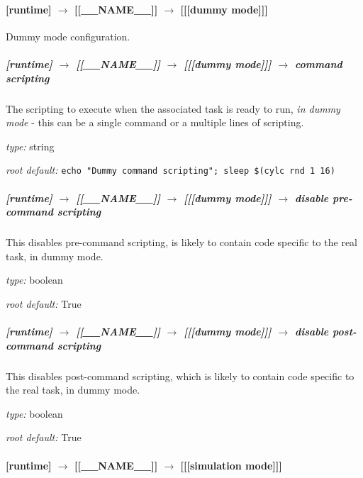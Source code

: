 \paragraph[{[[[}dummy mode{]]]}]{[runtime] $\rightarrow$ [[\_\_NAME\_\_]] $\rightarrow$ [[[dummy mode]]]}

Dummy mode configuration.

\subparagraph[command scripting]{[runtime] $\rightarrow$ [[\_\_NAME\_\_]] $\rightarrow$ [[[dummy mode]]] $\rightarrow$ command scripting}

The scripting to execute when the associated task is ready to run, {\em
in dummy mode} - this can be a single command or a multiple lines of
scripting.

\begin{myitemize}
\item {\em type:} string
\item {\em root default:} \lstinline=echo "Dummy command scripting"; sleep $(cylc rnd 1 16)=
\end{myitemize}

\subparagraph[disable pre-command scripting]{[runtime] $\rightarrow$ [[\_\_NAME\_\_]] $\rightarrow$ [[[dummy mode]]] $\rightarrow$ disable pre-command scripting}

This disables pre-command scripting, is likely to contain code specific
to the real task, in dummy mode.

\begin{myitemize}
\item {\em type:} boolean
\item {\em root default:} True
\end{myitemize}

\subparagraph[disable post-command scripting]{[runtime] $\rightarrow$ [[\_\_NAME\_\_]] $\rightarrow$ [[[dummy mode]]] $\rightarrow$ disable post-command scripting}

This disables post-command scripting, which is likely to contain code
specific to the real task, in dummy mode.

\begin{myitemize}
\item {\em type:} boolean
\item {\em root default:} True
\end{myitemize}

\paragraph[{[[[}simulation mode{]]]}]{[runtime] $\rightarrow$ [[\_\_NAME\_\_]] $\rightarrow$ [[[simulation mode]]]}

